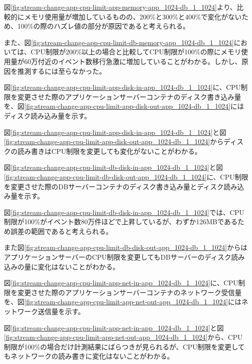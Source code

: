 \documentclass[../../../../main]{subfiles}
\begin{document}
    

    

    図\ref{fig:stream-change-app-cpu-limit-app-memory-app_1024-db_1_1024}より、比較的にメモリ使用量が増加しているものの、200\%と300\%と400\%で変化がないため、100\%の際のハズレ値の部分が原因であると考えられる。

    また、図\ref{fig:stream-change-app-cpu-limit-db-memory-app_1024-db_1_1024}においては、CPU制限が200\%以上の場合と比較してCPU制限が100\%の際にメモリ使用量が60万付近のイベント数移行急激に増加していることがわかる。しかし、原因を推測するには至らなかった。


    図\ref{fig:stream-change-app-cpu-limit-app-disk-in-app_1024-db_1_1024}に、CPU制限を変更させた際のアプリケーションサーバーコンテナのディスク書き込み量を、図\ref{fig:stream-change-app-cpu-limit-app-disk-out-app_1024-db_1_1024}にはディスク読み込み量を示す。

    
    

    図\ref{fig:stream-change-app-cpu-limit-app-disk-in-app_1024-db_1_1024}と図\ref{fig:stream-change-app-cpu-limit-app-disk-out-app_1024-db_1_1024}からディスクの読み書きはCPU制限を変更しても変化がないことがわかる。

    図\ref{fig:stream-change-app-cpu-limit-db-disk-in-app_1024-db_1_1024}と図\ref{fig:stream-change-app-cpu-limit-db-disk-out-app_1024-db_1_1024}に、CPU制限を変更させた際のDBサーバーコンテナのディスク書き込み量とディスク読み込み量を示す。

    
    

    図\ref{fig:stream-change-app-cpu-limit-db-disk-in-app_1024-db_1_1024}では、CPU制限が100\%がイベント数80万件ほどで上昇しているが、わずか126MBであるため誤差の範囲であると考えられる。

    また図\ref{fig:stream-change-app-cpu-limit-db-disk-out-app_1024-db_1_1024}からはアプリケーションサーバーのCPU制限を変更してもDBサーバーのディスク読み込みの量に変化はないことがわかる。


    図\ref{fig:stream-change-app-cpu-limit-app-net-in-app_1024-db_1_1024}に、CPU制限を変更させた際のアプリケーションサーバーコンテナのネットワーク受信量を、図\ref{fig:stream-change-app-cpu-limit-app-net-out-app_1024-db_1_1024}にはネットワーク送信量を示す。

    
    

    図\ref{fig:stream-change-app-cpu-limit-app-net-in-app_1024-db_1_1024}と図\ref{fig:stream-change-app-cpu-limit-app-net-out-app_1024-db_1_1024}から、CPU制限が100\%の場合だけ計測結果にばらつきが見られるが、CPU制限を変更してもネットワークの読み書きに変化はないことがわかる。
\end{document}

